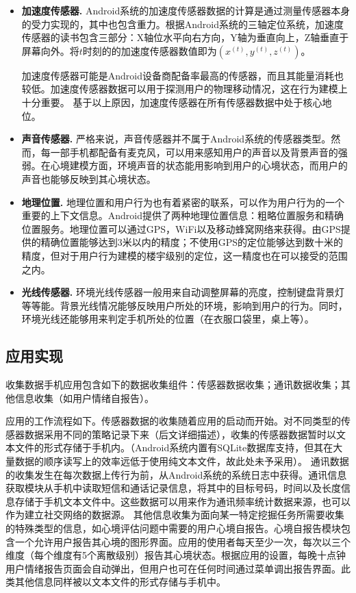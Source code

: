 \begin{itemize}
  \item \textbf{加速度传感器.} Android系统的加速度传感器数据的计算是通过测量传感器本身的受力实现的，其中也包含重力。根据Android系统的三轴定位系统，加速度传感器的读书包含三部分：X轴位水平向右方向，Y轴为垂直向上，Z轴垂直于屏幕向外\cite{sensorevent}。将$t$时刻的的加速度传感器数值即为$(x^{(t)}, y^{(t)}, z^{(t)})$。
  
  加速度传感器可能是Android设备商配备率最高的传感器，而且其能量消耗也较低。加速度传感器数据可以用于探测用户的物理移动情况，这在行为建模上十分重要。
  基于以上原因，加速度传感器在所有传感器数据中处于核心地位。

  \item \textbf{声音传感器.} 严格来说，声音传感器并不属于Android系统的传感器类型。然而，每一部手机都配备有麦克风，可以用来感知用户的声音以及背景声音的强弱。在心境建模方面，环境声音的状态能用影响到用户的心境状态，而用户的声音也能够反映到其心境状态。
  \item \textbf{地理位置.} 地理位置和用户行为也有着紧密的联系，可以作为用户行为的一个重要的上下文信息。Android提供了两种地理位置信息：粗略位置服务和精确位置服务。地理位置可以通过GPS，WiFi以及移动蜂窝网络来获得。由GPS提供的精确位置能够达到3米以内的精度；不使用GPS的定位能够达到数十米的精度，但对于用户行为建模的楼宇级别的定位，这一精度也在可以接受的范围之内。
  \item \textbf{光线传感器.} 环境光线传感器一般用来自动调整屏幕的亮度，控制键盘背景灯等等能。背景光线情况能够反映用户所处的环境，影响到用户的行为。同时，环境光线还能够用来判定手机所处的位置（在衣服口袋里，桌上等）。
\end{itemize}

\subsection{应用实现}
\label{system:sec:ApplicationImplementation}

收集数据手机应用包含如下的数据收集组件：传感器数据收集；通讯数据收集；其他信息收集（如用户情绪自报告）。 

应用的工作流程如下。传感器数据的收集随着应用的启动而开始。对不同类型的传感器数据采用不同的策略记录下来（后文详细描述），收集的传感器数据暂时以文本文件的形式存储于手机内。（Android系统内置有SQLite数据库支持，但其在大量数据的顺序读写上的效率远低于使用纯文本文件，故此处未予采用）。
%
通讯数据的收集发生在每次数据上传行为前，从Android系统的系统日志中获得。通讯信息获取模块从手机中读取短信和通话记录信息，将其中的目标号码，时间以及长度信息存储于手机文本文件中。这些数据可以用来作为通讯频率统计数据来源，也可以作为建立社交网络的数据源。
%
其他信息收集为面向某一特定挖掘任务所需要收集的特殊类型的信息，如心境评估问题中需要的用户心境自报告。心境自报告模块包含一个允许用户报告其心境的图形界面。应用的使用者每天至少一次，每次以三个维度（每个维度有5个离散级别）报告其心境状态。根据应用的设置，每晚十点钟用户情绪报告页面会自动弹出，但用户也可在任何时间通过菜单调出报告界面。此类其他信息同样被以文本文件的形式存储与手机中。

